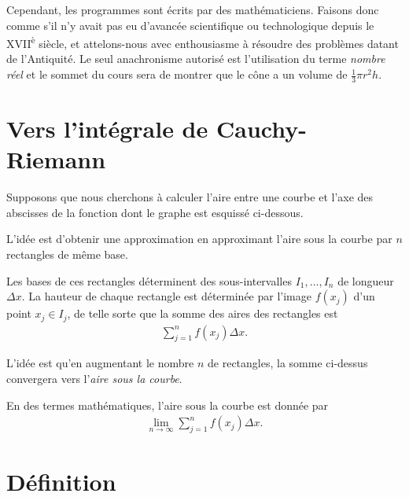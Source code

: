 \documentclass[main.tex]{subfiles}
\begin{document}
Cependant, les programmes sont écrits par des mathématiciens.
Faisons donc comme s'il n'y avait pas eu d'avancée scientifique ou technologique depuis le XVII\textsuperscript{è} siècle,
et attelons-nous avec enthousiasme à résoudre des problèmes datant de l'Antiquité.
Le seul anachronisme autorisé est l'utilisation du terme \emph{nombre réel}
et le sommet du cours sera de montrer que le cône a un volume de $\frac 1 3 \pi r^2 h$.

\section{Vers l'intégrale de Cauchy-Riemann}

Supposons que nous cherchons à calculer l'aire entre une courbe et l'axe des abscisses
de la fonction dont le graphe est esquissé ci-dessous.
\begin{plot}{0.5}{-1}{-1}{7}{7}
\end{plot}

L'idée est d'obtenir une approximation en approximant l'aire sous la courbe
par $n$ rectangles de même base.
\begin{plot}{0.5}{-2}{-1}{7}{7}
\end{plot}
Les bases de ces rectangles déterminent des sous-intervalles $I_1, \dots, I_n$ de longueur $\Delta x$.
La hauteur de chaque rectangle est déterminée par l'image $f(x_j)$ d'un point $x_j \in I_j$,
de telle sorte que la somme des aires des rectangles est
\begin{align}
    \sum_{j = 1}^n f(x_j) \Delta x.
\end{align}

L'idée est qu'en augmentant le nombre $n$ de rectangles,
la somme ci-dessus convergera vers l'\emph{aire sous la courbe}.
\begin{plot}{0.5}{-2}{-1}{7}{7}
\end{plot}
En des termes mathématiques,
l'aire sous la courbe est donnée par
\begin{align}
    \lim_{n \to \infty} \sum_{j = 1}^n f(x_j) \Delta x.
\end{align}

\section{Définition}
\end{document}

